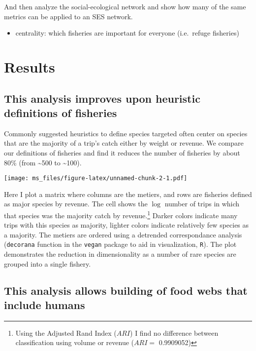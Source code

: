 \documentclass[]{article}
\begin{document}
And then analyze the social-ecological network and show how many of the
same metrics can be applied to an SES network.

\begin{itemize}
\itemsep1pt\parskip0pt
\item
  centrality: which fisheries are important for everyone (i.e.~refuge
  fisheries)
\end{itemize}

\section{Results}\label{results}

\subsection{This analysis improves upon heuristic definitions of
fisheries}\label{this-analysis-improves-upon-heuristic-definitions-of-fisheries}

Commonly suggested heuristics to define species targeted often center on
species that are the majority of a trip's catch either by weight or
revenue. We compare our definitions of fisheries and find it reduces the
number of fisheries by about 80\% (from \textasciitilde{}500 to
\textasciitilde{}100).

\texttt{[image: ms\_files/figure-latex/unnamed-chunk-2-1.pdf]}

Here I plot a matrix where columns are the metiers, and rows are
fisheries defined as major species by revenue. The cell shows the $\log$
number of trips in which that species was the majority catch by
revenue.\footnote{Using the Adjusted Rand Index ($ARI$) I find no
  difference between classification using volume or revenue ($ARI=$
  0.9909052)} Darker colors indicate many trips with this species as
majority, lighter colors indicate relatively few species as a majority.
The metiers are ordered using a detrended correspondance analysis
(\texttt{decorana} function in the \texttt{vegan} package to aid in
visualization, \texttt{R}). The plot demonstrates the reduction in
dimensionality as a number of rare species are grouped into a single
fishery.

\subsection{This analysis allows building of food webs that include
humans}\label{this-analysis-allows-building-of-food-webs-that-include-humans}
\end{document}
